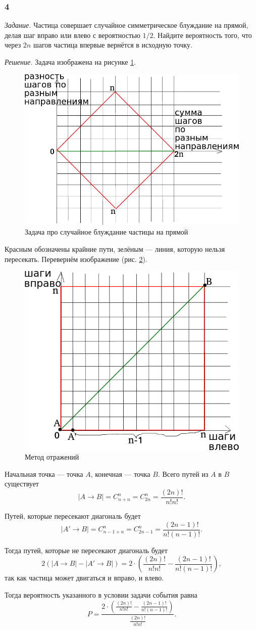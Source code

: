 \subsubsection*{4}

\textit{Задание.} Частица совершает случайное симметрическое блуждание на прямой, делая шаг вправо или влево с вероятностью $1/2$.
Найдите вероятность того, что через $2n$ шагов частица впервые вернётся в исходную точку.

\textit{Решение.} Задача изображена на рисунке \ref{fig:34}.

\begin{figure}[h!]
  \centering
  \includegraphics[width=.4\textwidth]{./pictures/t1v3_4.png}
  \caption{Задача про случайное блуждание частицы на прямой}
  \label{fig:34}
\end{figure}

Красным обозначены крайние пути, зелёным --- линия, которую нельзя пересекать.
Перевернём изображение (рис. \ref{fig:341}).

\begin{figure}[h!]
  \centering
  \includegraphics[width=.4\textwidth]{./pictures/t1v3_41.png}
  \caption{Метод отражений}
  \label{fig:341}
\end{figure}

Начальная точка --- точка $A$, конечная --- точка $B$.
Всего путей из $A$ в $B$ существует
$$ \left| A \rightarrow B \right| =
C_{n+n}^n =
C_{2n}^n =
\frac{ \left( 2n \right)!}{n!n!}.$$

Путей, которые пересекают диагональ будет
$$ \left| A' \rightarrow B \right| =
C_{n-1+n}^n =
C_{2n-1}^n =
\frac{ \left( 2n-1 \right)!}{n! \left( n-1 \right)!}.$$

Тогда путей, которые не пересекают диагональ будет
$$2 \left( \left| A \rightarrow B \right| - \left| A' \rightarrow B \right| \right) =
2 \cdot \left( \frac{ \left( 2n \right)!}{n!n!} - \frac{ \left( 2n-1 \right)!}{n! \left( n-1 \right)!} \right),$$
так как частица может двигаться и вправо, и влево.

Тогда вероятность указанного в условии задачи события равна
$$P =
\frac{2 \cdot \left( \frac{ \left( 2n \right)!}{n!n!} - \frac{ \left( 2n-1 \right)!}{n! \left( n-1 \right)!} \right) }{ \frac{ \left( 2n \right)!}{n!n!} }.$$
